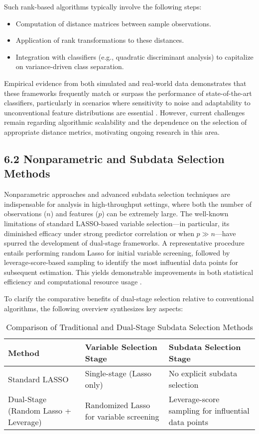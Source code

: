 \documentclass[11pt]{article}
\begin{document}
Such rank-based algorithms typically involve the following steps:

\begin{itemize}
    \item Computation of distance matrices between sample observations.
    \item Application of rank transformations to these distances.
    \item Integration with classifiers (e.g., quadratic discriminant analysis) to capitalize on variance-driven class separation.
\end{itemize}

Empirical evidence from both simulated and real-world data demonstrates that these frameworks frequently match or surpass the performance of state-of-the-art classifiers, particularly in scenarios where sensitivity to noise and adaptability to unconventional feature distributions are essential \cite{ref103}. However, current challenges remain regarding algorithmic scalability and the dependence on the selection of appropriate distance metrics, motivating ongoing research in this area.

\subsection{6.2 Nonparametric and Subdata Selection Methods}

Nonparametric approaches and advanced subdata selection techniques are indispensable for analysis in high-throughput settings, where both the number of observations ($n$) and features ($p$) can be extremely large. The well-known limitations of standard LASSO-based variable selection—in particular, its diminished efficacy under strong predictor correlation or when $p \gg n$—have spurred the development of dual-stage frameworks. A representative procedure entails performing random Lasso for initial variable screening, followed by leverage-score-based sampling to identify the most influential data points for subsequent estimation. This yields demonstrable improvements in both statistical efficiency and computational resource usage \cite{ref100}.

To clarify the comparative benefits of dual-stage selection relative to conventional algorithms, the following overview synthesizes key aspects:

\begin{table}[ht]
    \centering
    \caption{Comparison of Traditional and Dual-Stage Subdata Selection Methods}
    \label{tab:subdata_methods_comparison}
    \begin{tabular}{|l|p{4cm}|p{4cm}|}
        \hline
        \textbf{Method} & \textbf{Variable Selection Stage} & \textbf{Subdata Selection Stage} \\
        \hline
        Standard LASSO & Single-stage (Lasso only) & No explicit subdata selection \\
        \hline
        Dual-Stage (Random Lasso + Leverage) & Randomized Lasso for variable screening & Leverage-score sampling for influential data points \\
        \hline
    \end{tabular}
\end{table}
\end{document}
